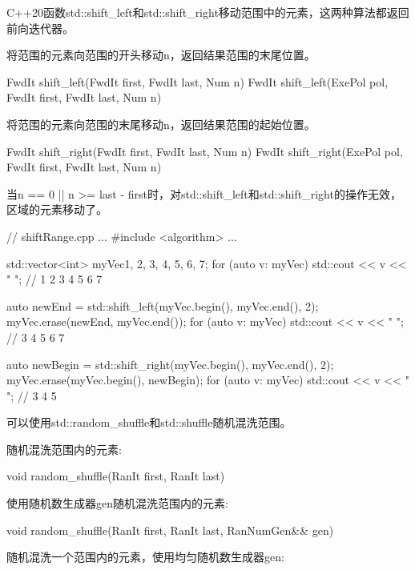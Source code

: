 
C++20函数std::shift\_left和std::shift\_right移动范围中的元素，这两种算法都返回前向迭代器。

将范围的元素向范围的开头移动n，返回结果范围的末尾位置。

\begin{cpp}
FwdIt shift_left(FwdIt first, FwdIt last, Num n)
FwdIt shift_left(ExePol pol, FwdIt first, FwdIt last, Num n)
\end{cpp}

将范围的元素向范围的末尾移动n，返回结果范围的起始位置。

\begin{cpp}
FwdIt shift_right(FwdIt first, FwdIt last, Num n)
FwdIt shift_right(ExePol pol, FwdIt first, FwdIt last, Num n)
\end{cpp}

当n == 0 || n >= last - first时，对std::shift\_left和std::shift\_right的操作无效，区域的元素移动了。


\begin{cpp}
// shiftRange.cpp
...
#include <algorithm>
...

std::vector<int> myVec{1, 2, 3, 4, 5, 6, 7};
for (auto v: myVec) std::cout << v << " "; // 1 2 3 4 5 6 7

auto newEnd = std::shift_left(myVec.begin(), myVec.end(), 2);
myVec.erase(newEnd, myVec.end());
for (auto v: myVec) std::cout << v << " "; // 3 4 5 6 7

auto newBegin = std::shift_right(myVec.begin(), myVec.end(), 2);
myVec.erase(myVec.begin(), newBegin);
for (auto v: myVec) std::cout << v << " "; // 3 4 5
\end{cpp}


可以使用std::random\_shuffle和std::shuffle随机混洗范围。

随机混洗范围内的元素:

\begin{cpp}
void random_shuffle(RanIt first, RanIt last)
\end{cpp}

使用随机数生成器gen随机混洗范围内的元素:

\begin{cpp}
void random_shuffle(RanIt first, RanIt last, RanNumGen&& gen)
\end{cpp}

随机混洗一个范围内的元素，使用均匀随机数生成器gen:

